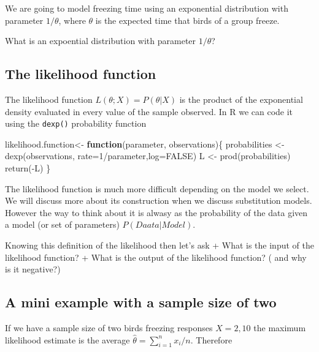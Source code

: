 \documentclass[
]{book}
\newenvironment{Shaded}{\begin{snugshade}}{\end{snugshade}}
\newcommand{\AttributeTok}[1]{\textcolor[rgb]{0.77,0.63,0.00}{#1}}
\newcommand{\ConstantTok}[1]{\textcolor[rgb]{0.00,0.00,0.00}{#1}}
\newcommand{\ControlFlowTok}[1]{\textcolor[rgb]{0.13,0.29,0.53}{\textbf{#1}}}
\newcommand{\DecValTok}[1]{\textcolor[rgb]{0.00,0.00,0.81}{#1}}
\newcommand{\FunctionTok}[1]{\textcolor[rgb]{0.00,0.00,0.00}{#1}}
\newcommand{\NormalTok}[1]{#1}
\newcommand{\OtherTok}[1]{\textcolor[rgb]{0.56,0.35,0.01}{#1}}
\newcommand{\SpecialCharTok}[1]{\textcolor[rgb]{0.00,0.00,0.00}{#1}}
\begin{document}
We are going to model freezing time using an exponential distribution with parameter \(1/\theta\), where \(\theta\) is the expected time that birds of a group freeze.

What is an expoential distribution with parameter \(1/\theta\)?

\hypertarget{the-likelihood-function}{%
\subsection{The likelihood function}\label{the-likelihood-function}}

The likelihood function \(L(\theta;X)=P(\theta|X)\) is the product of the exponential density evaluated in every value of the sample observed. In R we can code it using the \texttt{dexp()} probability function

\begin{Shaded}
\begin{Highlighting}[]
\NormalTok{likelihood.function}\OtherTok{\textless{}{-}} \ControlFlowTok{function}\NormalTok{(parameter, observations)\{}
\NormalTok{    probabilities }\OtherTok{\textless{}{-}}\FunctionTok{dexp}\NormalTok{(observations, }\AttributeTok{rate=}\DecValTok{1}\SpecialCharTok{/}\NormalTok{parameter,}\AttributeTok{log=}\ConstantTok{FALSE}\NormalTok{)}
\NormalTok{    L }\OtherTok{\textless{}{-}} \FunctionTok{prod}\NormalTok{(probabilities)}
    \FunctionTok{return}\NormalTok{(}\SpecialCharTok{{-}}\NormalTok{L)}
\NormalTok{\}}
\end{Highlighting}
\end{Shaded}

The likelihood function is much more difficult depending on the model we select. We will discuss more about its construction when we discuss substitution models. However the way to think about it is alwasy as the probability of the data given a model (or set of parameters) \(P(Daata|Model)\).

Knowing this definition of the likelihood then let's ask
+ What is the input of the likelihood function?
+ What is the output of the likelihood function? ( and why is it negative?)

\hypertarget{a-mini-example-with-a-sample-size-of-two}{%
\subsection{A mini example with a sample size of two}\label{a-mini-example-with-a-sample-size-of-two}}

If we have a sample size of two birds freezing responses \(X=2,10\) the maximum likelihood estimate is the average \(\hat{\theta}=\sum_{i=1}^n x_i/n\). Therefore
\end{document}
